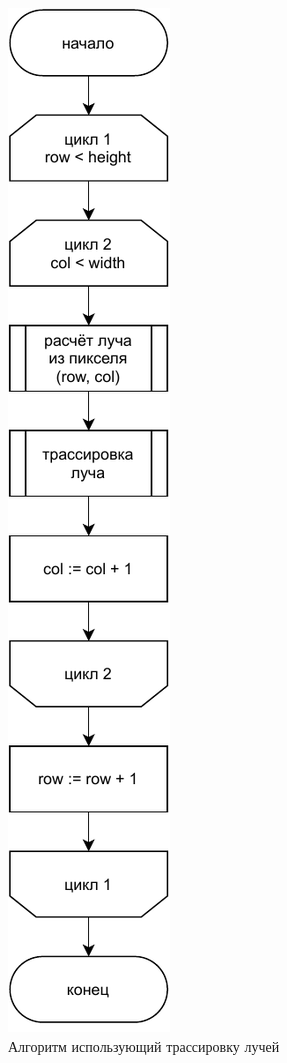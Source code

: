 \begin{figure}
	\centering
	\includegraphics[width=\linewidth,height=0.85\textheight,keepaspectratio]{diagrams/fancy.pdf}
	\caption{Алгоритм использующий трассировку лучей}
	\label{alg:fancy}
\end{figure}

